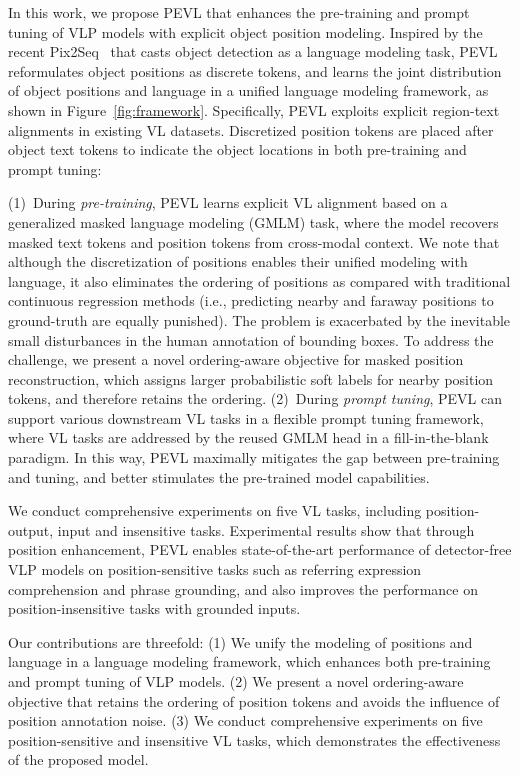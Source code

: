 \documentclass[11pt]{article}
\begin{document}
In this work, we propose PEVL that enhances the pre-training and prompt tuning of VLP models with explicit object position modeling. Inspired by the recent Pix2Seq~\cite{chen2021pix2seq} that casts object detection as a language modeling task, PEVL reformulates object positions as discrete tokens, and learns the joint distribution of object positions and language in a unified language modeling framework, as shown in Figure~\ref{fig:framework}. Specifically, PEVL exploits explicit region-text alignments in existing VL datasets. Discretized position tokens are placed after object text tokens to indicate the object locations in both pre-training and prompt tuning:

(1)~During \textit{pre-training}, PEVL learns explicit VL alignment based on a generalized masked language modeling (GMLM) task, where the model recovers masked text tokens and position tokens from cross-modal context. We note that although the discretization of positions enables their unified modeling with language, it also eliminates the ordering of positions as compared with traditional continuous regression methods (i.e., predicting nearby and faraway positions to ground-truth are equally punished). The problem is exacerbated by the inevitable small disturbances in the human annotation of bounding boxes. To address the challenge, we present a novel ordering-aware objective for masked position reconstruction, which assigns larger probabilistic soft labels for nearby position tokens, and therefore retains the ordering. (2)~During \textit{prompt tuning}, PEVL can support various downstream VL tasks in a flexible prompt tuning framework, where VL tasks are addressed by the reused GMLM head in a fill-in-the-blank paradigm. In this way, PEVL maximally mitigates the gap between pre-training and tuning, and better stimulates the pre-trained model capabilities.

We conduct comprehensive experiments on five VL tasks, including position- output, input and insensitive tasks. Experimental results show that through position enhancement, PEVL enables state-of-the-art performance of detector-free VLP models on position-sensitive tasks such as referring expression comprehension and phrase grounding, and also improves the performance on position-insensitive tasks with grounded inputs. 



Our contributions are threefold: (1) We unify the modeling of positions and language in a language modeling framework, which enhances both pre-training and prompt tuning of VLP models. (2) We present a novel ordering-aware objective that retains the ordering of position tokens and avoids the influence of position annotation noise. (3) We conduct comprehensive experiments on five position-sensitive and insensitive VL tasks, which demonstrates the effectiveness of the proposed model.
\end{document}
